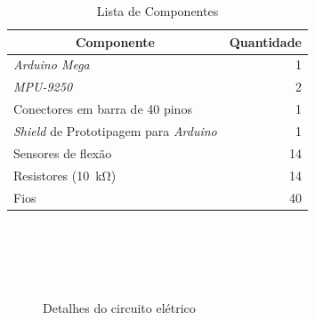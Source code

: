 \begin{table}[H]
  \centering
  \footnotesize
  \setlength{\abovecaptionskip}{0pt}
  \setlength{\belowcaptionskip}{0pt}
  \caption[Lista de Componentes]{Lista de Componentes}
  \label{tab:listacomponentes}
  \begin{tabular}{l r}
    \hline\hline
    \multicolumn{1}{c}{Componente}&\multicolumn{1}{c}{Quantidade}\\
    \hline
    \textit{Arduino Mega}           & 1 \\
    \textit{MPU-9250}               & 2 \\
    Conectores em barra de 40 pinos & 1 \\
    \textit{Shield} de Prototipagem para \textit{Arduino} & 1 \\
    Sensores de flexão              & 14 \\
    Resistores (\SI{10}{\kilo\ohm}) & 14 \\
    Fios & 40\\
    \hline\hline
  \end{tabular}
  \\\vspace{1.3mm}
\end{table}

\begin{figure}[H]
  \setlength{\abovecaptionskip}{0pt}
  \setlength{\belowcaptionskip}{0pt}
  \caption[Detalhes do circuito elétrico]{Detalhes do circuito elétrico}
  \centering
  \\
  \\
  \label{fig:circLuva1}
  \captionsetup{justification=centering}
\end{figure}

